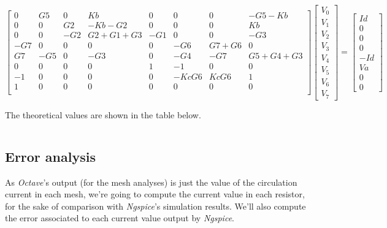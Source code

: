$$
\begin{bmatrix}
0 & G5 & 0 & Kb & 0 & 0 & 0 & -G5-Kb \\
0 & 0 & G2 & -Kb-G2 & 0 & 0 & 0 & Kb \\
0 & 0 & -G2 & G2+G1+G3 & -G1 & 0 & 0 & -G3 \\
-G7 & 0 & 0 & 0 & 0 & -G6 & G7+G6 & 0 \\
G7 & -G5 & 0 & -G3 & 0 & -G4 & -G7 & G5+G4+G3 \\
0 & 0 & 0 & 0 & 1 & -1 & 0 & 0 \\
-1 & 0 & 0 & 0 & 0 & -KcG6 & KcG6 & 1 \\
1 & 0 & 0 & 0 & 0 & 0 & 0 & 0 \\
\end{bmatrix}
\begin{bmatrix}
V_0 \\
V_1 \\
V_2 \\
V_3 \\
V_4 \\
V_5 \\
V_6 \\
V_7  
\end{bmatrix}
=
\begin{bmatrix}
Id \\
0 \\
0 \\
0 \\
-Id \\
Va \\
0 \\
0  
\end{bmatrix}
$$

The theoretical values are shown in the table below.
\vspace{5mm}
\begin{table}[ht]
\centering
\begin{tabularx}{0.8\textwidth} {
  | >{\raggedright\arraybackslash}X
  | >{\raggedleft\arraybackslash}X | }
 \hline

\end{tabularx}
\end{table}

\subsection{Error analysis}
\label{ssec:Error analysis}
\par As \emph{Octave}'s output (for the mesh analyses) is just the value of the circulation current in each mesh, we're going to compute the current value in each resistor, for the sake of comparison with \emph{Ngspice}'s simulation results. We'll also compute the error associated to each current value output by \emph{Ngspice}.
\vspace{5mm}

